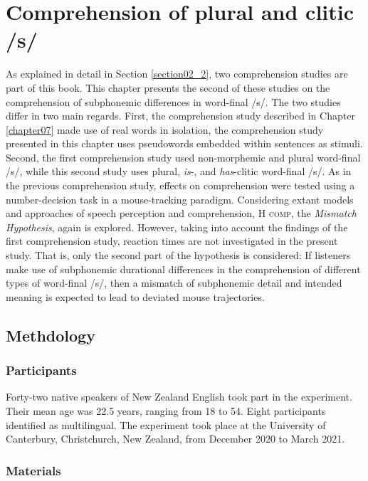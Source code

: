 \chapter{Comprehension of plural and clitic /s/}\label{chapter08}

As explained in detail in Section \ref{section02_2}, two comprehension studies are part of this book. This chapter presents the second of these studies on the comprehension of subphonemic differences in word-final /s/. The two studies differ in two main regards. First, the comprehension study described in Chapter \ref{chapter07} made use of real words in isolation, the comprehension study presented in this chapter uses pseudowords embedded within sentences as stimuli. Second, the first comprehension study used non-morphemic and plural word-final /s/, while this second study uses plural, \textit{is}-, and \textit{has}-clitic word-final /s/. As in the previous comprehension study, effects on comprehension were tested using a number-decision task in a mouse-tracking paradigm. Considering extant models and approaches of speech perception and comprehension, \textsc{H comp}, the \textit{Mismatch Hypothesis}, again is explored. However, taking into account the findings of the first comprehension study, reaction times are not investigated in the present study. That is, only the second part of the hypothesis is considered: If listeners make use of subphonemic durational differences in the comprehension of different types of word-final /s/, then a mismatch of subphonemic detail and intended meaning is expected to lead to deviated mouse trajectories.

\section{Methdology}\label{section08_1}

\subsection{Participants}\label{section08_1_1}

Forty-two native speakers of New Zealand English took part in the experiment. Their mean age was 22.5 years, ranging from 18 to 54. Eight participants identified as multilingual. The experiment took place at the University of Canterbury, Christchurch, New Zealand, from December 2020 to March 2021.

\subsection{Materials}\label{section08_1_2}

